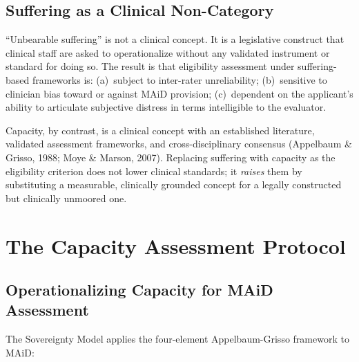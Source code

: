 \documentclass[11pt, letterpaper]{article}
\begin{document}
\subsection{Suffering as a Clinical Non-Category}

``Unbearable suffering'' is not a clinical concept. It is a legislative construct that
clinical staff are asked to operationalize without any validated instrument or standard
for doing so. The result is that eligibility assessment under suffering-based frameworks
is: (a)~subject to inter-rater unreliability; (b)~sensitive to clinician bias toward or
against MAiD provision; (c)~dependent on the applicant's ability to articulate
subjective distress in terms intelligible to the evaluator.

Capacity, by contrast, is a clinical concept with an established literature, validated
assessment frameworks, and cross-disciplinary consensus (Appelbaum \& Grisso, 1988;
Moye \& Marson, 2007). Replacing suffering with capacity as the eligibility criterion
does not lower clinical standards; it \textit{raises} them by substituting a measurable,
clinically grounded concept for a legally constructed but clinically unmoored one.

\section{The Capacity Assessment Protocol}

\subsection{Operationalizing Capacity for MAiD Assessment}

The Sovereignty Model applies the four-element Appelbaum-Grisso framework to MAiD:
\end{document}
